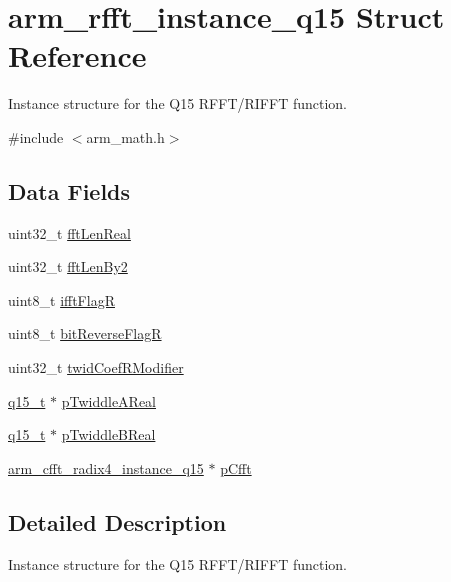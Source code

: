 \hypertarget{structarm__rfft__instance__q15}{}\section{arm\+\_\+rfft\+\_\+instance\+\_\+q15 Struct Reference}
\label{structarm__rfft__instance__q15}


Instance structure for the Q15 R\+F\+F\+T/\+R\+I\+F\+FT function.  




{\ttfamily \#include $<$arm\+\_\+math.\+h$>$}

\subsection*{Data Fields}
\begin{DoxyCompactItemize}
\item 
uint32\+\_\+t \mbox{\hyperlink{structarm__rfft__instance__q15_adf0d4604cf5546075d9d4cf122d6c986}{fft\+Len\+Real}}
\item 
uint32\+\_\+t \mbox{\hyperlink{structarm__rfft__instance__q15_ae7db13e0e2999656d98c4223de5b1284}{fft\+Len\+By2}}
\item 
uint8\+\_\+t \mbox{\hyperlink{structarm__rfft__instance__q15_a787d72055c89e4d62b188d6bd646341c}{ifft\+FlagR}}
\item 
uint8\+\_\+t \mbox{\hyperlink{structarm__rfft__instance__q15_ad56ec2425e2422108b8767b43d944591}{bit\+Reverse\+FlagR}}
\item 
uint32\+\_\+t \mbox{\hyperlink{structarm__rfft__instance__q15_a5b06f7f76c018db993fe6acc5708c589}{twid\+Coef\+R\+Modifier}}
\item 
\mbox{\hyperlink{arm__math_8h_ab5a8fb21a5b3b983d5f54f31614052ea}{q15\+\_\+t}} $\ast$ \mbox{\hyperlink{structarm__rfft__instance__q15_ac17beaa033ab1ea242d49037276b67e2}{p\+Twiddle\+A\+Real}}
\item 
\mbox{\hyperlink{arm__math_8h_ab5a8fb21a5b3b983d5f54f31614052ea}{q15\+\_\+t}} $\ast$ \mbox{\hyperlink{structarm__rfft__instance__q15_a67a618de57c3a7420ee05fda1a80bf3a}{p\+Twiddle\+B\+Real}}
\item 
\mbox{\hyperlink{structarm__cfft__radix4__instance__q15}{arm\+\_\+cfft\+\_\+radix4\+\_\+instance\+\_\+q15}} $\ast$ \mbox{\hyperlink{structarm__rfft__instance__q15_ae0ac7c3a89699793fc0dac960db7f056}{p\+Cfft}}
\end{DoxyCompactItemize}


\subsection{Detailed Description}
Instance structure for the Q15 R\+F\+F\+T/\+R\+I\+F\+FT function. 

